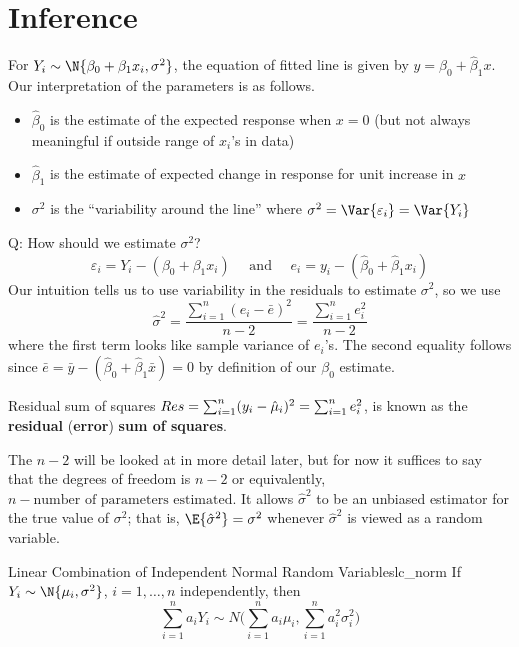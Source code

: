 \section{Inference}
For $ Y_i \sim \N{\beta_0+\beta_1x_i,\sigma^2} $,
the equation of fitted line
is given by $ y=\hat{\beta}_0+\hat{\beta}_1x $. Our
interpretation of the parameters is as follows.
\begin{itemize}
    \item $ \hat{\beta}_0 $ is the estimate
          of the expected response when $ x=0 $ (but not always
          meaningful if outside range of $ x_i $'s in data)
    \item $ \hat{\beta}_1 $ is the estimate of
          expected change in response for unit increase in $ x $
    \item $ \sigma^2 $ is the
          ``variability around the line''
          where $ \sigma^2=\Var{\varepsilon_i}=\Var{Y_i} $
\end{itemize}
Q\@: How should we estimate $ \sigma^2 $?
\[ \varepsilon_i=Y_i-(\beta_0+\beta_1x_i)
    \quad\text{ and }\quad e_i=y_i-(\hat{\beta}_0+\hat{\beta}_1x_i) \]
Our intuition tells us to use variability in the residuals to estimate
$ \sigma^2 $, so we use
\[ \hat{\sigma}^2
    =\frac{\sum_{i=1}^{n} (e_i-\bar{e})^2}{n-2}=
    \frac{\sum_{i=1}^{n} e_i^2}{n-2}  \]
where the first term looks like sample variance of $ e_i $'s.
The second equality follows since
$ \bar{e}=\bar{y}-(\hat{\beta}_0+\hat{\beta}_1\bar{x})=0 $
by definition of our $ \beta_0 $ estimate.
\begin{Definition}{Residual sum of squares}{}
    $ \relax{Res}=
        \sum_{i=1}^{n} (y_i-\hat{\mu}_i)^2=
        \sum_{i=1}^{n} e_i^2 $,
    is known as the \textbf{residual} (\textbf{error})
    \textbf{sum of squares}.
\end{Definition}
\begin{Remark}{}{}
    The $ n-2 $ will be looked at in more detail later, but for now
    it suffices to say that the degrees of freedom
    is $ n-2 $ or equivalently, $ n- \text{number of parameters
            estimated}$. It allows $ \hat{\sigma}^2 $ to be an unbiased estimator
    for the true value of $ \sigma^2 $; that is,
    $ \E{\hat{\sigma}^2}=\sigma^2 $
    whenever $ \hat{\sigma}^2 $ is viewed as a random variable.
\end{Remark}
\begin{Theorem}{Linear Combination of Independent Normal Random Variables}{lc_norm}
    If $ Y_i \sim \N{\mu_i,\sigma^2} $, $ i=1,\ldots,n $
    independently, then
    \[ \sum_{i=1}^{n} a_i Y_i \sim N
        \biggl( \sum_{i=1}^{n} a_i\mu_i,\sum_{i=1}^{n} a_i^2\sigma_i^2 \biggr) \]
\end{Theorem}
